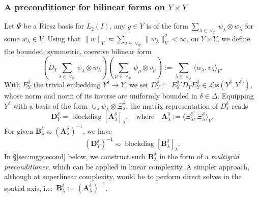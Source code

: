 \documentclass[11pt,a4paper,oneside,english]{amsart}
\numberwithin{equation}{section}
\numberwithin{theorem}{section}
\theoremstyle{definition}
\DeclareMathOperator{\blockdiag}{blockdiag}
\newcommand{\la}{\langle}
\newcommand{\ra}{\rangle}
\newcommand{\cL}{\mathcal L}
\newcommand{\Lis}{\cL\mathrm{is}}
\begin{document}
\subsubsection{A preconditioner for bilinear forms on $Y \times Y$}
Let $\Psi$ be a Riesz basis for $L_2(I)$, any $y \in Y$ is of the form
$\sum_{\lambda \in \vee_{\Phi}} \psi_\lambda \otimes w_\lambda$ for some $w_\lambda \in V$.
Using that $\|w\|_Y \eqsim \sum_{\lambda \in \vee_\Psi} \|w_\lambda\|_V^2 < \infty$,
on $Y \times Y$, we define the bounded, symmetric, coercive bilinear form
\[
  (D_Y \sum_{\lambda \in \vee_{\Phi}} \psi_\lambda \otimes w_\lambda)(\sum_{\mu \in \vee_{\Phi}} \psi_\mu \otimes v_\mu ) := \sum_{\lambda \in \vee_\Psi} \la w_\lambda, v_\lambda \ra_V.
\]
With $E_Y^\delta$ the trivial embedding $Y^\delta \to Y$,
we set $D_Y^\delta := {E_Y^\delta}' D_Y E_Y^\delta \in \Lis(Y^\delta, {Y^\delta}')$,
whose norm and norm of its inverse are uniformly bounded in $\delta \in \Delta$.
Equipping $Y^\delta$ with a basis of the form $\cup_\lambda \psi_\lambda \otimes \Xi_\lambda^\delta$,
the matrix representation of $D_Y^\delta$ reads
\[
  \mathbf D_Y^\delta = \blockdiag [\mathbf A_\lambda^\delta]_\lambda, \quad \text{where} \quad \mathbf A_\lambda^\delta := \la \Xi_\lambda^\delta, \Xi_\lambda^\delta \ra_V.
\]
For given $\mathbf B_\lambda^\delta \eqsim (\mathbf A_\lambda^\delta)^{-1}$, we have
\[
  (\mathbf D_Y^\delta)^{-1} \eqsim \blockdiag[\mathbf B_\lambda^\delta]_\lambda.
\]
In \S\ref{sec:mgprecond} below, we construct such $\mathbf B_\lambda^\delta$ in the form of a
\emph{multigrid preconditioner}, which can be applied in linear complexity. A
simpler approach, although at superlinear complexity, would be to perform direct
solves in the spatial axis, i.e.~$\mathbf B_\lambda^\delta := (\mathbf A_\lambda^\delta)^{-1}$.
\end{document}
